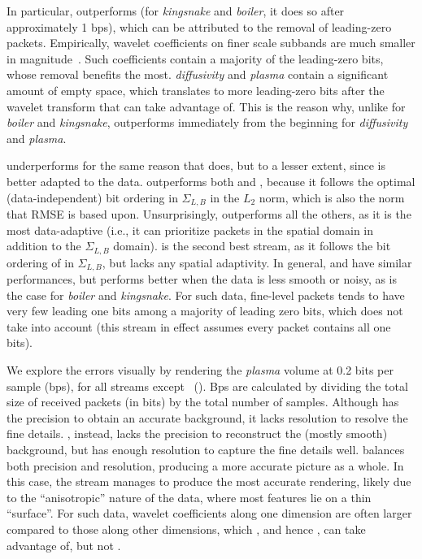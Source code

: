 In particular, \sbit outperforms \slvl (for \emph{kingsnake} and \emph{boiler}, it does so after
approximately 1 bps), which can be attributed to the removal of leading-zero packets. Empirically,
wavelet coefficients on finer scale subbands are much smaller in magnitude~\cite{spiht1996}. Such
coefficients contain a majority of the leading-zero bits, whose removal benefits \sbit the most.
\emph{diffusivity} and \emph{plasma} contain a significant amount of empty space, which translates
to more leading-zero bits after the wavelet transform that \sbit can take advantage of. This is the
reason why, unlike for \emph{boiler} and \emph{kingsnake}, \sbit outperforms \slvl immediately from
the beginning for \emph{diffusivity} and \emph{plasma}.

\smag underperforms for the same reason that \slvl does, but to a lesser extent, since \smag is
better adapted to the data. \swav outperforms both \slvl and \sbit, because it follows the optimal
(data-independent) bit ordering in $\Sigma_{L,B}$ in the $L_2$ norm, which is also the norm that
RMSE is based upon. Unsurprisingly, \srop outperforms all the others, as it is the most
data-adaptive (i.e., it can prioritize packets in the spatial domain in addition to the
$\Sigma_{L,B}$ domain). \srsg is the second best stream, as it follows the bit ordering of \srop in
$\Sigma_{L,B}$, but lacks any spatial adaptivity. In general, \swav and \ssig have similar
performances, but \ssig performs better when the data is less smooth or noisy, as is the case for
\emph{boiler} and \emph{kingsnake}. For such data, fine-level packets tends to have very few leading
one bits among a majority of leading zero bits, which \swav does not take into account (this stream
in effect assumes every packet contains all one bits).

We explore the errors visually by rendering the \emph{plasma} volume at 0.2 bits per sample (bps),
for all streams except \srop ~(). Bps are calculated by dividing the total
size of received packets (in bits) by the total number of samples. Although \slvl has the precision
to obtain an accurate background, it lacks resolution to resolve the fine details. \sbit, instead,
lacks the precision to reconstruct the (mostly smooth) background, but has enough resolution to
capture the fine details well. \swav balances both precision and resolution, producing a more
accurate picture as a whole. In this case, the \ssig stream manages to produce the most accurate
rendering, likely due to the ``anisotropic'' nature of the data, where most features lie on a thin
``surface''. For such data, wavelet coefficients along one dimension are often larger compared to
those along other dimensions, which \srop, and hence \srsg, can take advantage of, but not \swav.
